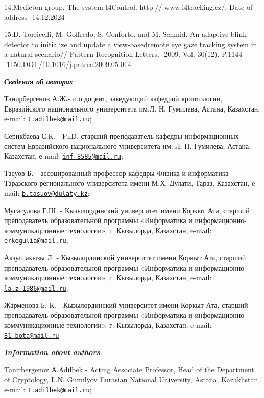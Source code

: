 14.Medicton group. The system I4Control. http:// www.i4tracking.cz/.
Date of address- 14.12.2024

15.D. Torricelli, M. Goffredo, S. Conforto, and M. Schmid. An adaptive
blink detector to initialize and update a view-basedremote eye gaze
tracking system in a natural scenario// Pattern Recognition Letters.-
2009.-Vol. 30(12).-P.1144
-1150.\href{https://doi.org/10.1016/j.patrec.2009.05.014}{DOI
/10.1016/j.patrec.2009.05.014}

\emph{{\bfseries Сведения об авторах}}

Танирбергенов А.Ж{\bfseries .}- и.о.доцент, заведующий кафедрой
криптологии, Евразийского национального университета им.Л. Н. Гумилева,
Астана, Казахстан, е-mail:
\href{mailto:t.adilbek@mail.ru}{\nolinkurl{t.adilbek@mail.ru}};

Серикбаева С.К. - PhD, старший преподаватель кафедры информационных
систем Евразийского национального университета им. Л. Н. Гумилева,
Астана, Казахстан, е-mail:
\href{mailto:inf_8585@mail.ru}{\nolinkurl{inf\_8585@mail.ru}};

Тасуов Б. - ассоцированный профессор кафедры Физика и информатика
Таразского регионального университета имени М.Х. Дулати, Тараз,
Казахстан, е-mail:
\href{mailto:b.tasuov@dulaty.kz}{\nolinkurl{b.tasuov@dulaty.kz}};

Мусагулова Г.Ш. - Кызылординский университет имени Коркыт Ата, старший
преподаватель образовательной программы «Информатика и
информационно-коммуникационные технологии», г. Кызылорда, Казахстан,
e-mail: \href{mailto:erkegulia@mail.ru}{\nolinkurl{erkegulia@mail.ru}};

Акзуллакызы Л. - Кызылординский университет имени Коркыт Ата, старший
преподаватель образовательной программы «Информатика и
информационно-коммуникационные технологии», г. Кызылорда, Казахстан,
e-mail: \href{mailto:la.z_1986@mail.ru}{\nolinkurl{la.z\_1986@mail.ru}};

Жарменова Б. К. - Кызылординский университет имени Коркыт Ата, старший
преподаватель образовательной программы «Информатика и
информационно-коммуникационные технологии», г. Кызылорда, Казахстан,
e-mail: \href{mailto:81_bota@mail.ru}{\nolinkurl{81\_bota@mail.ru}}

\emph{{\bfseries Information about authors}}

Tanirbergenov А.Adilbek - Acting Associate Professor, Head of the
Department of Cryptology, L.N. Gumilyov Eurasian National University,
Astana, Kazakhstan, е-mail:
\href{mailto:t.adilbek@mail.ru}{\nolinkurl{t.adilbek@mail.ru}};

